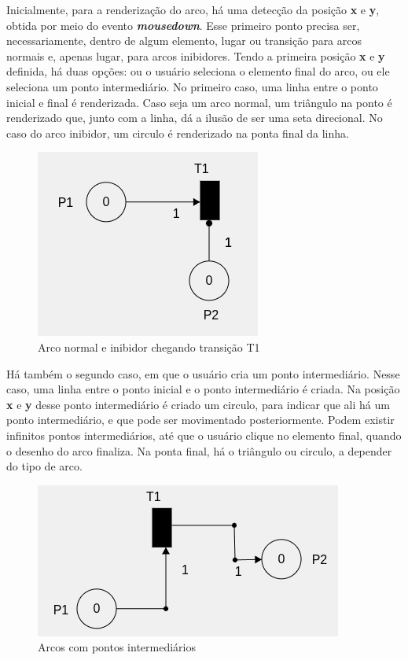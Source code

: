 \documentclass[
	12pt,				%
	openright,			%
	oneside,			%
	a4paper,			%
	english,			%
	brazil				%
	]{abntex2}
\theoremstyle{doispontos}
\begin{document}


Inicialmente, para a renderização do arco, há uma detecção da posição \textbf{x} e \textbf{y}, obtida por meio do evento \textbf{\textit{mousedown}}. Esse primeiro ponto precisa ser, necessariamente, dentro de algum elemento, lugar ou transição para arcos normais e, apenas lugar, para arcos inibidores. Tendo a primeira posição \textbf{x} e \textbf{y} definida, há duas opções: ou o usuário seleciona o elemento final do arco, ou ele seleciona um ponto intermediário. No primeiro caso, uma linha entre o ponto inicial e final é renderizada. Caso seja um arco normal, um triângulo na ponto é renderizado que, junto com a linha, dá a ilusão de ser uma seta direcional. No caso do arco inibidor, um circulo é renderizado na ponta final da linha. 

\begin{figure}[ht] 
	\centering
	\includegraphics[scale=0.7]{figuras/arcNormalInibidor.png}
	\caption[Arco normal e inibidor]{Arco normal e inibidor chegando transição T1}
	\label{fig:arcNormalInibidor}
\end{figure}

Há também o segundo caso, em que o usuário cria um ponto intermediário. Nesse caso, uma linha entre o ponto inicial e o ponto intermediário é criada. Na posição \textbf{x} e \textbf{y} desse ponto intermediário é criado um circulo, para indicar que ali há um ponto intermediário, e que pode ser movimentado posteriormente. Podem existir infinitos pontos intermediários, até que o usuário clique no elemento final, quando o desenho do arco finaliza. Na ponta final, há o triângulo ou circulo, a depender do tipo de arco. 

\begin{figure}[ht] 
	\centering
	\includegraphics[scale=0.8]{figuras/arcPontoIntermediario.png}
	\caption[Arco com pontos intermediários]{Arcos com pontos intermediários}
	\label{fig:arcPontoIntermediario}
\end{figure}
\end{document}
